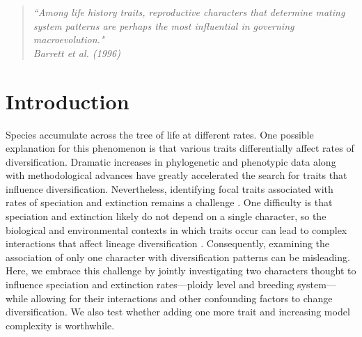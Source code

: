 \begin{quote}
\em{``Among life history traits, reproductive characters that determine mating system patterns are perhaps the most influential in governing macroevolution." 
}
\\
\hspace*{\fill}\rm{ Barrett et al. (1996)}
\end{quote}

\section{Introduction}

Species accumulate across the tree of life at different rates. 
One possible explanation for this phenomenon is that various traits differentially affect rates of diversification. 
Dramatic increases in phylogenetic and phenotypic data along with methodological advances have greatly accelerated the search for traits that influence diversification. 
Nevertheless, identifying focal traits associated with rates of speciation and extinction remains a challenge \citep[\eg][]{maddison_2015, rabosky_2015, beaulieu_2016, rabosky_2017}. 
One difficulty is that speciation and extinction likely do not depend on a single character, so the biological and environmental contexts in which traits occur can lead to complex interactions that affect lineage diversification \citep{beaulieu_2016, caetano_2018, herrera_2018}.
Consequently, examining the association of only one character with diversification patterns can be misleading. 
Here, we embrace this challenge by jointly investigating two characters thought to influence speciation and extinction rates---ploidy level and breeding system---while allowing for their interactions and other confounding factors to change diversification. We also test whether adding one more trait and increasing model complexity is worthwhile.

